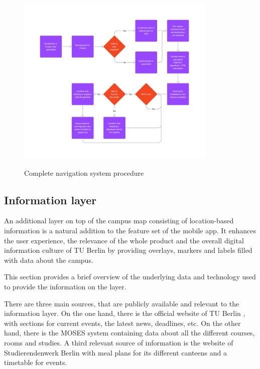 \begin{figure}[!ht]
	\centering
	\includegraphics[width=0.85\textwidth]{images/navigation_process.png}\\
	\caption{Complete navigation system procedure}
    \label{fig:navigation_system}
\end{figure}

\subsection{Information layer}
An additional layer on top of the campus map consisting of location-based information is a natural addition to the feature set of the mobile app. It enhances the user experience, the relevance of the whole product and the overall digital information culture of TU Berlin by providing overlays, markers and labels filled with data about the campus.

This section provides a brief overview of the underlying data and technology used to provide the information on the layer.

There are three main sources, that are publicly available and relevant to the information layer. On the one hand, there is the official website of TU Berlin \cite{tu_berlin_main}, with sections for current events, the latest news, deadlines, etc. On the other hand, there is the MOSES system \cite{tu_berlin_moses} containing data about all the different courses, rooms and studies. A third relevant source of information is the website of Studierendenwerk Berlin \cite{studierendenwerk_berlin} with meal plans for its different canteens and a timetable for events.

